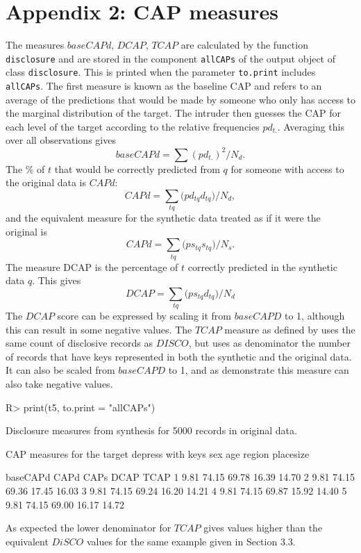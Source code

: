 \documentclass[12pt]{article}
\renewcommand{\baselinestretch}{1.5} %
\begin{document}
\section*{Appendix 2: CAP measures }{\label{sec:app2}}

The measures $baseCAPd$, $DCAP$, $TCAP$ are calculated by the function \texttt{disclosure} and are stored in the component \texttt{allCAPs} of the output object of class \texttt{disclosure}. This is printed when the parameter \texttt{to.print} includes \texttt{allCAPs}. The first measure is known as the baseline CAP and refers to an average of the predictions that would be made by someone who only has access to the marginal distribution of the target. The intruder then guesses the CAP for each level of the target according to the relative frequencies $pd_{t.}$. Averaging this over all observations gives
\begin{equation}
  \nonumber baseCAPd = \sum{(pd_{t.})^2}/N_d.
\end{equation}
The \% of $t$ that would be correctly predicted from $q$ for someone with access to the original data is $CAPd$:
\begin{equation}
  \nonumber CAPd = \sum\limits_{tq}{(pd_{tq}}d_{tq})/N_d,
\end{equation}
and the equivalent measure for the synthetic data treated as if it were the original is
\begin{equation}
  \nonumber CAPd = \sum\limits_{tq}{(ps_{tq}}s_{tq})/N_s.
\end{equation}
The measure  DCAP is the percentage of $t$ correctly predicted in the synthetic data  $q$. This gives
\begin{equation}
  \nonumber DCAP = \sum\limits_{tq}{(ps_{tq}}d_{tq})/N_d
\end{equation}
The $DCAP$ score can be expressed  by scaling it from  $baseCAPD$ to 1\cite{little2022,lotte}, although this can result in some negative values.
The $TCAP$ measure as defined by \cite{little2022} uses the same count of disclosive records
as $DISCO$, but uses as denominator the number of records that have keys represented in both the synthetic and the original data. It can also be scaled from $baseCAPD$ to 1,
and as \cite{little2022} demonstrate this measure can also take negative values.
\renewcommand{\baselinestretch}{1.0}
\begin{Schunk}
\begin{Sinput}
R> print(t5, to.print = "allCAPs")
\end{Sinput}
\begin{Soutput}
Disclosure measures from synthesis for 5000 records in original data.

CAP measures for the target depress with keys
sex age region placesize 

  baseCAPd  CAPd  CAPs  DCAP  TCAP
1     9.81 74.15 69.78 16.39 14.70
2     9.81 74.15 69.36 17.45 16.03
3     9.81 74.15 69.24 16.20 14.21
4     9.81 74.15 69.87 15.92 14.40
5     9.81 74.15 69.00 16.17 14.72
\end{Soutput}
\end{Schunk}
\renewcommand{\baselinestretch}{1.5}
As expected the lower denominator for $TCAP$ gives values higher than the equivalent $DiSCO$ values for the same example given in Section 3.3.
\end{document}
